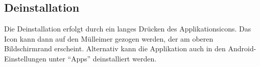 \subsection{Deinstallation}
Die Deinstallation erfolgt durch ein langes Drücken des Applikationsicons. Das Icon kann dann auf den Mülleimer gezogen werden, der am oberen Bildschirmrand erscheint. Alternativ kann die Applikation auch in den Android-Einstellungen unter \enquote{Apps} deinstalliert werden.